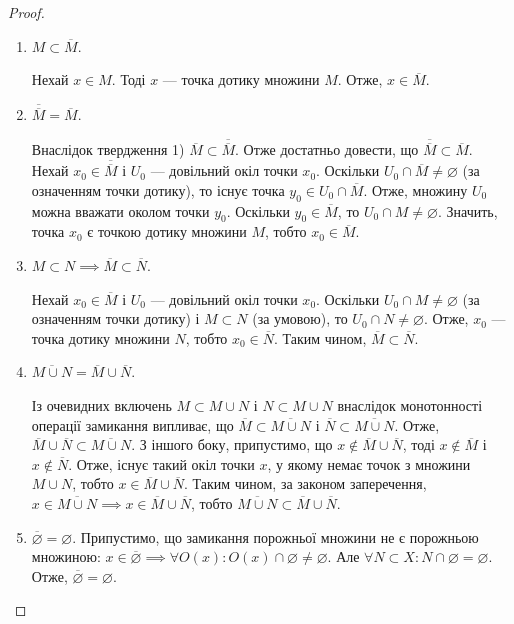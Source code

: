 \documentclass[a4paper, 12pt]{article}
\newcommand{\nothing}{$\left.\right.$}
\renewcommand{\emptyset}{\varnothing}
\begin{document}
\begin{proof}
	\nothing
	\begin{enumerate}
		\item $M \subset \overline{M}$. \smallskip

		Нехай $x \in M$. Тоді $x$ --- точка дотику множини $M$. Отже,
		$x \in \overline{M}$.

		\item $\overline{\overline{M}} = \overline{M}$. \smallskip

		Внаслідок твердження 1) $\overline{M} \subset \overline{\overline{M}}$. Отже достатньо
		довести, що $\overline{\overline{M}} \subset \overline{M}$. Нехай $x_0 \in \overline{\overline{M}}$ і $U_0$ --- довільний окіл
		точки $x_0$. Оскільки $U_0 \cap \overline{M} \ne \emptyset$ (за означенням точки
		дотику), то існує точка $y_0 \in U_0 \cap \overline{M}$. Отже, множину $U_0$
		можна вважати околом точки $y_0$. Оскільки $y_0 \in \overline{M}$, то
		$U_0 \cap M \ne \emptyset$. Значить, точка $x_0$ є точкою дотику
		множини $M$, тобто $x_0 \in \overline{M}$.

		\item $M \subset N \implies \overline{M} \subset \overline{N}$. \smallskip

		Нехай $x_0 \in \overline{M}$ і $U_0$ --- довільний окіл точки $x_0$. Оскільки
		$U_0 \cap M \ne \emptyset$ (за означенням точки дотику) і $M \subset N$ (за
		умовою), то $U_0 \cap N \ne \emptyset$. Отже, $x_0$ --- точка дотику
		множини $N$, тобто $x_0 \in \overline{N}$. Таким чином, $\overline{M} \subset \overline{N}$.

		\item $\overline{M \cup N} = \overline{M} \cup \overline{N}$. \smallskip

		Із очевидних включень $M \subset M \cup N$ і $N \subset M \cup N$
		внаслідок монотонності операції замикання випливає, що
		$\overline{M} \subset \overline{M \cup N}$ і $\overline{N} \subset \overline{M \cup N}$. Отже, $\overline{M} \cup \overline{N} \subset \overline{M \cup N}$. З іншого
		боку, припустимо, що $x \notin \overline{M} \cup \overline{N}$, тоді $x \notin \overline{M}$ і $x \notin \overline{N}$. Отже,
		існує такий окіл точки $x$, у якому немає точок з множини
		$M \cup N$, тобто $x \in \overline{M} \cup \overline{N}$. Таким чином, за законом
		заперечення, $x \in \overline{M \cup N} \implies x \in \overline{M} \cup \overline{N}$, тобто
		$\overline{M \cup N} \subset \overline{M} \cup \overline{N}$.
		
		\item $\overline{\emptyset} = \emptyset$.
		Припустимо, що замикання порожньої множини не є
		порожньою множиною: $x \in \overline{\emptyset} \implies \forall O(x): O(x) \cap \emptyset \ne \emptyset$. Але
		$\forall N \subset X: N \cap \emptyset = \emptyset$. Отже, $\overline{\emptyset} = \emptyset$.
	\end{enumerate}
\end{proof}
\end{document}
